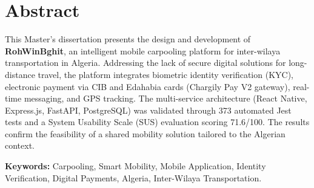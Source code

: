 \chapter*{Abstract}
\thispagestyle{empty}

This Master's dissertation presents the design and development of \textbf{RohWinBghit}, an intelligent mobile carpooling platform for inter-wilaya transportation in Algeria. Addressing the lack of secure digital solutions for long-distance travel, the platform integrates biometric identity verification (KYC), electronic payment via CIB and Edahabia cards (Chargily Pay V2 gateway), real-time messaging, and GPS tracking. The multi-service architecture (React Native, Express.js, FastAPI, PostgreSQL) was validated through 373 automated Jest tests and a System Usability Scale (SUS) evaluation scoring 71.6/100. The results confirm the feasibility of a shared mobility solution tailored to the Algerian context.

\vspace{0.3cm}
\textbf{Keywords:} Carpooling, Smart Mobility, Mobile Application, Identity Verification, Digital Payments, Algeria, Inter-Wilaya Transportation.
